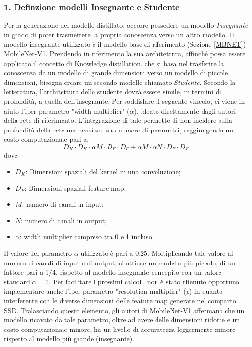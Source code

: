 \subsubsection{1. Definzione modelli Insegnante e Studente}
Per la generazione del modello distillato, occorre possedere un modello 
\emph{Insegnante} in grado di poter trasmettere la propria conoscenza verso un 
altro modello. Il modello insegnante utilizzato è il modello base di riferimento 
(Sezione \ref{MBNET}) MobileNet-V1. Prendendo in riferimento la sua architettura, 
affinché possa essere applicato il concetto di Knowledge distillation, che 
si basa nel trasferire la conoscenza da un modello di grande dimensioni 
verso un modello di piccole dimensioni, bisogna creare un secondo modello 
chiamato \emph{Studente}. Secondo la letteratura, l'architettura dello studente 
dovrà essere simile, in termini di profondità, a quella dell'insegnante. Per 
soddisfare il seguente vincolo,  ci viene in aiuto l'iper-parametro "width 
multiplier" ($\alpha$), ideato direttamente dagli autori della rete di riferimento. 
L'integrazione di tale permette di non incidere sulla profondità della rete ma 
bensì sul suo numero di parametri, raggiungendo un costo computazionale 
pari a:
\begin{equation}
    D_K \cdot D_K \cdot \alpha M \cdot D_F \cdot D_F + \alpha M \cdot \alpha N \cdot D_F \cdot D_F
\end{equation}
dove:
\begin{itemize}
    \item $D_K$: Dimensioni spaziali del kernel in una convoluzione;
    \item $D_F$: Dimensioni spaziali feature map;
    \item $M$: numero di canali in input;
    \item $N$: numero di canali in output;
    \item $\alpha$: width multiplier compreso tra 0 e 1 incluso.
\end{itemize}
Il valore del parametro $\alpha$ utilizzato è pari a 0.25. Moltiplicando tale valore 
al numero di canali di input e di output, si ottiene un modello più piccolo, 
di un fattore pari a $1/4$, rispetto al modello insegnante concepito con un 
valore standard $\alpha=1$. Per facilitare i prossimi calcoli, non è stato ritenuto 
opportuno implementare anche l'iper-parametro "resolution multiplier" (\emph{p}) 
in quanto interferente con le diverse dimensioni delle feature map generate 
nel comparto SSD. Tralasciando questo elemento, gli autori di MobileNet-V1 
affermano che un modello ricavato da tale parametro, oltre ad avere 
delle dimensioni ridotte e un costo computazionale minore, ha un livello di 
accuratezza leggermente minore rispetto al modello più grande (insegnante). 

